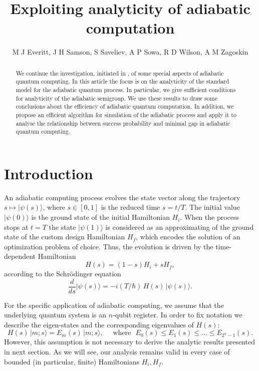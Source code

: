 \documentclass[11 pt]{article}
\begin{document}
\title{Exploiting analyticity of adiabatic computation}
\author{M J Everitt, J H Samson, S Saveliev, A P Sowa, R D Wilson, A M Zagoskin }

\date{}
\maketitle
\newtheorem{definition}{Definition}[section]
\newtheorem{theorem}{Theorem}[section]
\newtheorem{lemma}{Lemma}[section]
\newtheorem{corollary}{Corollary}[section]

\begin{abstract}
We continue the investigation, initiated in \cite{stripes}, of some special aspects of adiabatic quantum computing. In this article the focus is on the analyticity of the standard model for the adiabatic quantum process. In particular, we give sufficient conditions for analyticity of the adiabatic semigroup. We use these results to draw some conclusions about the efficiency of adiabatic quantum computation. In addition, we propose an efficient algorithm for simulation of the adiabatic process and apply it to analyse the relationship between success probability and minimal gap in adiabatic quantum computing. 
\end{abstract}

\section{Introduction}

An adiabatic computing process evolves the state vector along the trajectory $s\mapsto |\psi(s)\rangle$, where $s\in[0,1]$ is the reduced time $s=t/T$. The initial value $|\psi(0)\rangle$ is the ground state of the initial Hamiltonian $H_i$. When the process stops at $t=T$ the state $|\psi(1)\rangle$ is considered as an approximating of the ground state of the custom design Hamiltonian $H_f$, which encodes the solution of an optimization problem of choice. Thus, the evolution is driven by the time-dependent Hamiltonian
\begin{equation}\label{Ham_of_s}
H(s) = (1-s) H_i +s H_f,
\end{equation}
according to the Schr\"{o}dinger equation
\begin{equation}\label{Schr_of_s}
\frac{d}{ds} |\psi(s)\rangle= -i(T/\hbar)\, H(s)\,|\psi(s)\rangle.
\end{equation}

For the specific application of adiabatic computing, we assume that the underlying quantum system is an $n$-qubit register. In order to fix notation we describe the eigen-states and the corresponding eigenvalues of $H(s)$:
\begin{equation}
H(s) \,|m;s\rangle = E_m(s)\,|m;s\rangle,\quad  \mbox{ where }\,\, E_0(s)\leq E_1(s) \leq \ldots \leq E_{2^n-1}(s).
\end{equation}
However, this assumption is not necessary to derive the analytic results presented in next section. As we will see, our analysis remains valid in every case of bounded (in particular, finite) Hamiltonians $H_i, H_f$.
\end{document}
